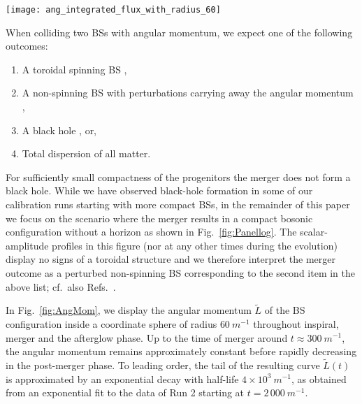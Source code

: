 \documentclass[11pt]{report}  %
\begin{document}
\begin{figure*}[t]
\begin{center}
{\texttt{[image: ang\_integrated\_flux\_with\_radius\_60]}}
\caption{
    {\bf Angular momentum of the scalar field}: We show the angular
    momentum $\tilde{L}$ (see definition in  \cref{eqn:DefAngMom}) inside a coordinate sphere of radius $60~m^{-1}$ as a function of time. We compute
    $\tilde{L}$ in two ways, (i) via integrating the outgoing flux -- solid lines (see \cref{eqn:DefAngMomFlux}) -- and (ii) as a volume-integral --
    dotted lines. This was plotted using run 2 of \cref{tab:Overview
    Runs}}
\label{fig:AngMom}
\end{center}
\end{figure*}
When colliding two BSs with angular momentum, we
expect one of the following outcomes:
\begin{enumerate}
    \item A toroidal spinning BS
        \cite{PhysRevD.90.024068,Yoshida:1997qf,1996rscc.conf..138S,Siemonsen:2020hcg},
    \item A non-spinning BS with perturbations carrying away the angular
        momentum
        \cite{Macedo:2013jja,Macedo:2016wgh,Yoshida:1994xi,Flores:2019iwp},
    \item A black hole \cite{Helfer:2018vtq,Palenzuela:2017kcg,Bezares:2018qwa}, or,
    \item Total dispersion of all matter.
\end{enumerate}
For sufficiently small compactness of the progenitors the merger does not form a black hole. While we have observed black-hole
formation in some of our calibration runs starting with more compact
BSs, in the remainder of this paper we focus on the scenario
where the merger results in a compact bosonic configuration
without a horizon as shown in Fig.~\ref{fig:Panellog}.
The scalar-amplitude profiles in this figure (nor at any other
times during the evolution) display no signs
of a toroidal structure and we therefore interpret the merger
outcome as a perturbed non-spinning BS corresponding to the
second item in the above list; cf.~also
Refs.~\cite{Palenzuela:2017kcg,Bezares:2018qwa}.



In Fig.~\ref{fig:AngMom}, we display
the angular momentum $\tilde{L}$ of the BS configuration
inside a coordinate sphere of radius $60~m^{-1}$ throughout
inspiral, merger and the afterglow phase. Up to the time
of merger around $t\approx 300~m^{-1}$, the angular momentum
remains approximately constant before rapidly decreasing
in the post-merger phase. To leading order,
the tail of the resulting curve
$\tilde{L}(t)$ is approximated by an exponential decay with
half-life $4\times10^3~m^{-1}$, as obtained from an exponential
fit to the data of Run 2 starting at $t=2\,000~m^{-1}$.
\end{document}
